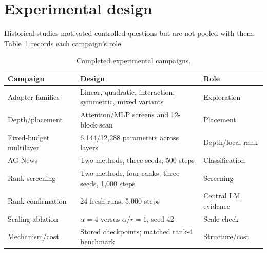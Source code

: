 \documentclass[11pt]{article}
\begin{document}
\FloatBarrier\section{Experimental design}
Historical studies motivated controlled questions but are not pooled with them. Table~\ref{tab:campaigns} records each campaign's role.
\begin{table}[ht]\centering\small
\caption{Completed experimental campaigns.}\label{tab:campaigns}
\begin{tabular}{p{.2\linewidth}p{.49\linewidth}p{.21\linewidth}}\toprule
Campaign&Design&Role\\\midrule
Adapter families&Linear, quadratic, interaction, symmetric, mixed variants&Exploration\\
Depth/placement&Attention/MLP screens and 12-block scan&Placement\\
Fixed-budget multilayer&6,144/12,288 parameters across layers&Depth/local rank\\
AG News&Two methods, three seeds, 500 steps&Classification\\
Rank screening&Two methods, four ranks, three seeds, 1,000 steps&Screening\\
Rank confirmation&24 fresh runs, 5,000 steps&Central LM evidence\\
Scaling ablation&$\alpha=4$ versus $\alpha/r=1$, seed 42&Scale check\\
Mechanism/cost&Stored checkpoints; matched rank-4 benchmark&Structure/cost\\\bottomrule
\end{tabular}\end{table}
\end{document}
